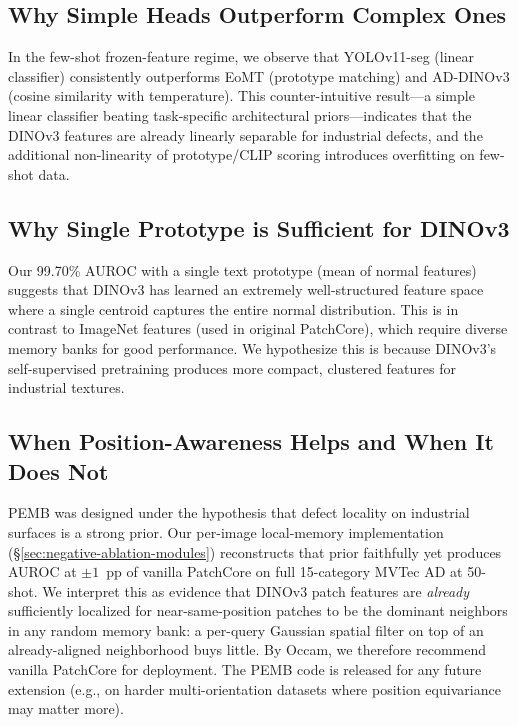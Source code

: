 \documentclass[journal]{IEEEtran}
\begin{document}
\subsection{Why Simple Heads Outperform Complex Ones}
In the few-shot frozen-feature regime, we observe that YOLOv11-seg (linear classifier) consistently outperforms EoMT (prototype matching) and AD-DINOv3 (cosine similarity with temperature). This counter-intuitive result---a simple linear classifier beating task-specific architectural priors---indicates that the DINOv3 features are already linearly separable for industrial defects, and the additional non-linearity of prototype/CLIP scoring introduces overfitting on few-shot data.

\subsection{Why Single Prototype is Sufficient for DINOv3}
Our 99.70\% AUROC with a single text prototype (mean of normal features) suggests that DINOv3 has learned an extremely well-structured feature space where a single centroid captures the entire normal distribution. This is in contrast to ImageNet features (used in original PatchCore), which require diverse memory banks for good performance. We hypothesize this is because DINOv3's self-supervised pretraining produces more compact, clustered features for industrial textures.

\subsection{When Position-Awareness Helps and When It Does Not}
\label{sec:disc-pemb}
PEMB was designed under the hypothesis that defect locality on industrial surfaces is a strong prior. Our per-image local-memory implementation (\S\ref{sec:negative-ablation-modules}) reconstructs that prior faithfully yet produces AUROC at $\pm 1$~pp of vanilla PatchCore on full 15-category MVTec AD at 50-shot. We interpret this as evidence that DINOv3 patch features are \emph{already} sufficiently localized for near-same-position patches to be the dominant neighbors in any random memory bank: a per-query Gaussian spatial filter on top of an already-aligned neighborhood buys little. By Occam, we therefore recommend vanilla PatchCore for deployment. The PEMB code is released for any future extension (e.g., on harder multi-orientation datasets where position equivariance may matter more).
\end{document}

